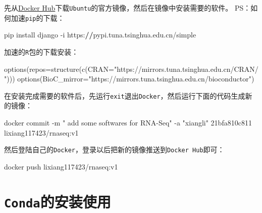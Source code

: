 \documentclass[
  10pt,
]{book}
\newenvironment{Shaded}{\begin{snugshade}}{\end{snugshade}}
\newcommand{\AttributeTok}[1]{\textcolor[rgb]{0.77,0.63,0.00}{#1}}
\newcommand{\ErrorTok}[1]{\textcolor[rgb]{0.64,0.00,0.00}{\textbf{#1}}}
\newcommand{\FunctionTok}[1]{\textcolor[rgb]{0.00,0.00,0.00}{#1}}
\newcommand{\NormalTok}[1]{#1}
\newcommand{\SpecialCharTok}[1]{\textcolor[rgb]{0.00,0.00,0.00}{#1}}
\newcommand{\StringTok}[1]{\textcolor[rgb]{0.31,0.60,0.02}{#1}}
\begin{document}
先从\href{https://hub.docker.com/}{Docker Hub}下载\texttt{Ubuntu}的官方镜像，然后在镜像中安装需要的软件。
PS：如何加速\texttt{pip}的下载：

\begin{Shaded}
\begin{Highlighting}[]
\NormalTok{pip install django }\SpecialCharTok{{-}}\NormalTok{i https}\SpecialCharTok{:}\ErrorTok{//}\NormalTok{pypi.tuna.tsinghua.edu.cn}\SpecialCharTok{/}\NormalTok{simple}
\end{Highlighting}
\end{Shaded}

加速的\texttt{R}包的下载安装：

\begin{Shaded}
\begin{Highlighting}[]
\FunctionTok{options}\NormalTok{(}\AttributeTok{repos=}\FunctionTok{structure}\NormalTok{(}\FunctionTok{c}\NormalTok{(}\AttributeTok{CRAN=}\StringTok{"https://mirrors.tuna.tsinghua.edu.cn/CRAN/"}\NormalTok{)))}
\FunctionTok{options}\NormalTok{(}\AttributeTok{BioC\_mirror=}\StringTok{"https://mirrors.tuna.tsinghua.edu.cn/bioconductor"}\NormalTok{)}
\end{Highlighting}
\end{Shaded}

在安装完成需要的软件后，先运行\texttt{exit}退出\texttt{Docker}，然后运行下面的代码生成新的镜像：

\begin{Shaded}
\begin{Highlighting}[]
\NormalTok{docker commit }\SpecialCharTok{{-}}\NormalTok{m }\StringTok{" add some softwares for RNA{-}Seq"} \SpecialCharTok{{-}}\NormalTok{a }\StringTok{"xiangli"}\NormalTok{ 21bfa810c811 lixiang117423}\SpecialCharTok{/}\NormalTok{rnaseq}\SpecialCharTok{:}\NormalTok{v1}
\end{Highlighting}
\end{Shaded}

然后登陆自己的\texttt{Docker}，登录以后把新的镜像推送到\texttt{Docker\ Hub}即可：

\begin{Shaded}
\begin{Highlighting}[]
\NormalTok{docker push lixiang117423}\SpecialCharTok{/}\NormalTok{rnaseq}\SpecialCharTok{:}\NormalTok{v1}
\end{Highlighting}
\end{Shaded}

\hypertarget{condaux7684ux5b89ux88c5ux4f7fux7528}{%
\section{\texorpdfstring{\texttt{Conda}的安装使用}{Conda的安装使用}}\label{condaux7684ux5b89ux88c5ux4f7fux7528}}
\end{document}
